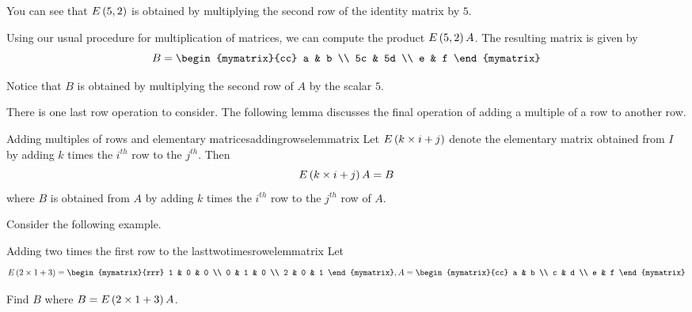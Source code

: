 \begin{solution}
You can see that $E \left(5, 2\right)$ is obtained by multiplying the second row 
of the identity matrix by $5$.

Using our usual procedure for multiplication of matrices, we can compute the product $E \left(5, 2\right)A$. The 
resulting matrix is given by 
\begin{equation*}
B
=\begin{mymatrix}{cc}
a & b \\
5c & 5d \\
e & f
\end{mymatrix}
\end{equation*}

Notice that $B$ is obtained by multiplying the second row of $A$ by the scalar $5$. 
\end{solution}

There is one last row operation to consider. The following lemma discusses the final
operation of adding a multiple of a row to another row.

\begin{lemma}{Adding multiples of rows and elementary matrices}{addingrowselemmatrix}
Let $E\left(k \times i+j\right) $ denote the elementary
matrix obtained from $I$ by adding $k$ times the $i^{th}$ row to the $j^{th}$. Then
\begin{equation*}
E\left(k \times i+j\right) A=B
\end{equation*}
where $B$ is obtained from $A$ by adding $k$ times the $i^{th}$ row to the $j^{th}$ row of $A.$
\end{lemma}

Consider the following example.

\begin{example}{Adding two times the first row to the last}{twotimesrowelemmatrix}
Let
\begin{equation*}
E\tup{2 \times 1+3} = \begin{mymatrix}{rrr}
1 & 0 & 0 \\
0 & 1 & 0 \\
2 & 0 & 1
\end{mymatrix}, A =  \begin{mymatrix}{cc}
a & b \\
c & d \\
e & f
\end{mymatrix} 
\end{equation*}

Find $B$ where $B = E\left(2 \times 1+3\right)A$.
\end{example}

